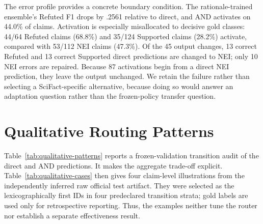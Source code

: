\documentclass[11pt]{article}
\begin{document}
The error profile provides a concrete boundary condition. The rationale-trained ensemble's Refuted F1 drops by .2561 relative to direct, and AND activates on 44.0\% of claims. Activation is especially misallocated to decisive gold classes: 44/64 Refuted claims (68.8\%) and 35/124 Supported claims (28.2\%) activate, compared with 53/112 \textsc{NEI} claims (47.3\%). Of the 45 output changes, 13 correct Refuted and 13 correct Supported direct predictions are changed to \textsc{NEI}; only 10 \textsc{NEI} errors are repaired. Because 87 activations begin from a direct \textsc{NEI} prediction, they leave the output unchanged. We retain the failure rather than selecting a SciFact-specific alternative, because doing so would answer an adaptation question rather than the frozen-policy transfer question.

\section{Qualitative Routing Patterns}\label{app:qualitative}
Table~\ref{tab:qualitative-patterns} reports a frozen-validation transition audit of the direct and AND predictions. It makes the aggregate trade-off explicit. Table~\ref{tab:qualitative-cases} then gives four claim-level illustrations from the independently inferred raw official test artifact. They were selected as the lexicographically first IDs in four predeclared transition strata; gold labels are used only for retrospective reporting. Thus, the examples neither tune the router nor establish a separate effectiveness result.
\end{document}
